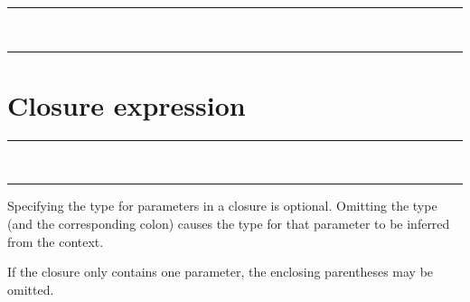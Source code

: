 \begin{grammar}
\rule{exclusive-range-expression}   \\
\rule{inclusive-range-expression}   
\end{grammar}

\section{Closure expression}

\begin{grammar}
\rule{closure-expression} \code{(}  \code{)} \code{->} \\
\rule{closure-expression} \code{(}  \code{)} \code{->} 
\end{grammar}

Specifying the type for parameters in a closure  is
optional. Omitting the type (and the corresponding colon) causes the type for
that parameter to be inferred from the context.

If the closure  only contains one parameter, the
enclosing parentheses may be omitted.

